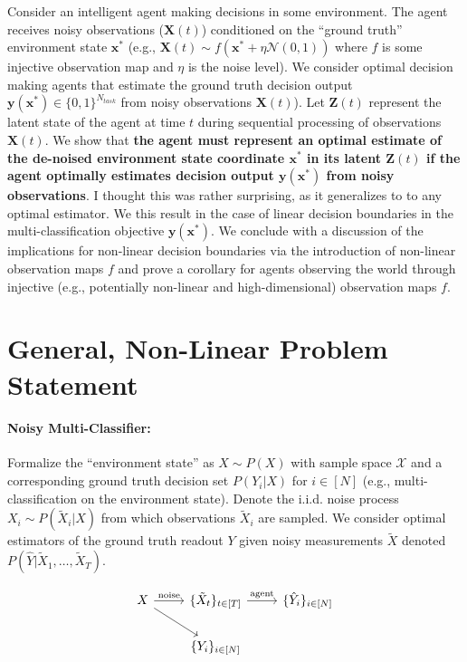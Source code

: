 \documentclass[12pt]{article}
\begin{document}
Consider an intelligent agent making decisions in some environment.
The agent receives noisy observations ($\mathbf X(t)$) conditioned on the ``ground truth'' environment state $\mathbf x^*$ (e.g., $\mathbf X(t) \sim f(\mathbf x^* + \eta \mathcal N(0, 1))$ where $f$ is some injective observation map and $\eta$ is the noise level). 
We consider optimal decision making agents that estimate the ground truth decision output $\mathbf y(\mathbf x^*) \in \{0, 1\}^{N_{task}}$ from noisy observations $\mathbf X(t)$). 
Let $\mathbf Z(t)$ represent the latent state of the agent at time $t$ during sequential processing of observations $\mathbf X(t)$. 
We show that \textbf{the agent must represent an optimal estimate of the de-noised environment state coordinate $\mathbf x^*$ in its latent $\mathbf Z(t)$ if the agent optimally estimates decision output $\mathbf y(\mathbf x^*)$ from noisy observations}. 
I thought this was rather surprising, as it generalizes to to any optimal estimator. 
We this result in the case of linear decision boundaries in the multi-classification objective $\mathbf y(\mathbf x^*)$. 
We conclude with a discussion of the implications for non-linear decision boundaries via the introduction of non-linear observation maps $f$ and prove a corollary for agents observing the world through injective (e.g., potentially non-linear and high-dimensional) observation maps $f$.






\section{General, Non-Linear Problem Statement}
\label{sec:intro}


\paragraph{Noisy Multi-Classifier: } Formalize the ``environment state'' as $X
\sim P(X)$ with sample space $\mathcal X$ and a corresponding ground truth 
decision set $P(Y_i | X)$ for $i\in [N]$ (e.g., multi-classification on
the environment state). 
Denote the i.i.d. noise process $X_i \sim P(\tilde X_i | X)$ from which
observations $\tilde X_i$ are sampled. 
We consider optimal estimators of the ground truth readout $Y$ given noisy
measurements $\tilde X$ denoted $P(\hat Y | \tilde X_1, \dots, \tilde X_T)$. 


\begin{equation}
	\label{eqn:prob_statement}
	\begin{tikzcd}
		X \arrow[rd] \arrow[r, "\text{noise}"] & \{\tilde X_t\}_{t\in [T]} \arrow[r, "\text{agent}"] & \{\hat Y_i\}_{i\in [N]}\\
		& \{Y_i\}_{i\in [N]}
	\end{tikzcd}
\end{equation}
\end{document}
